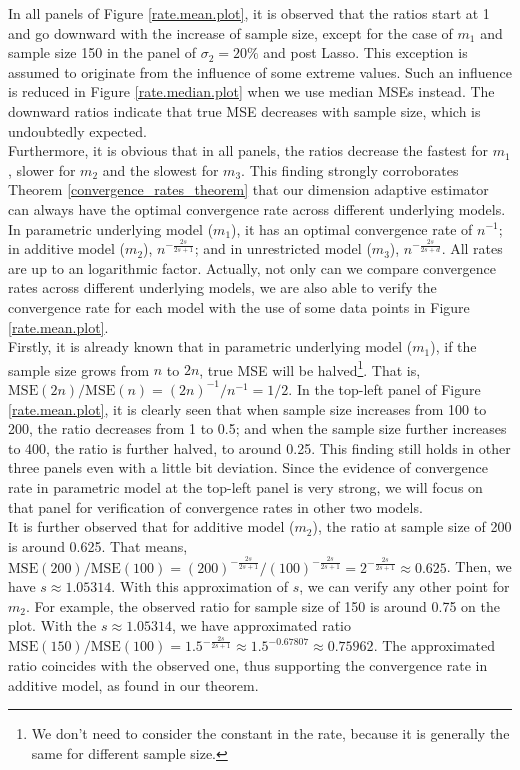 \documentclass[12pt, a4paper]{article}
\theoremstyle{MAstyle} \newtheorem{assumption}{Assumption}[section]
\theoremstyle{MAstyle} \newtheorem{definition}{Definition}[section]
\theoremstyle{MAstyle} \newtheorem{theorem}{Theorem}[section]
\theoremstyle{MAstyle} \newtheorem{corollary}{Corollary}[section]
\begin{document}
                In all panels of Figure \ref{rate.mean.plot}, it is observed that the ratios start at 1 and go downward with the increase of sample size, except for the case of $m_1$ and sample size 150 in the panel of $\sigma_2=20\%$ and post Lasso. This exception is assumed to originate from the influence of some extreme values. Such an influence is reduced in Figure \ref{rate.median.plot} when we use median MSEs instead. The downward ratios indicate that true MSE decreases with sample size, which is undoubtedly expected.\\

                Furthermore, it is obvious that in all panels, the ratios decrease the fastest for $m_1$, slower for $m_2$ and the slowest for $m_3$. This finding strongly corroborates Theorem \ref{convergence_rates_theorem} that our dimension adaptive estimator can always have the optimal convergence rate across different underlying models. In parametric underlying model ($m_1$), it has an optimal convergence rate of $n^{-1}$; in additive model ($m_2$), $n^{-\frac{2s}{2s+1}}$; and in unrestricted model ($m_3$), $n^{-\frac{2s}{2s+d}}$. All rates are up to an logarithmic factor. Actually, not only can we compare convergence rates across different underlying models, we are also able to verify the convergence rate for each model with the use of some data points in Figure \ref{rate.mean.plot}.\\

                Firstly, it is already known that in parametric underlying model ($m_1$), if the sample size grows from $n$ to $2n$, true MSE will be halved\footnote{We don't need to consider the constant in the rate, because it is generally the same for different sample size.}. That is, $\mathrm{MSE}(2n)/\mathrm{MSE}(n)=(2n)^{-1}/n^{-1}=1/2$. In the top-left panel of Figure \ref{rate.mean.plot}, it is clearly seen that when sample size increases from 100 to 200, the ratio decreases from 1 to 0.5; and when the sample size further increases to 400, the ratio is further halved, to around 0.25. This finding still holds in other three panels even with a little bit deviation. Since the evidence of convergence rate in parametric model at the top-left panel is very strong, we will focus on that panel for verification of convergence rates in other two models.\\

                It is further observed that for additive model ($m_2$), the ratio at sample size of 200 is around 0.625. That means, $\mathrm{MSE}(200)/\mathrm{MSE}(100)=(200)^{-\frac{2s}{2s+1}}/(100)^{-\frac{2s}{2s+1}}=2^{-\frac{2s}{2s+1}} \approx 0.625$. Then, we have $s \approx 1.05314$. With this approximation of $s$, we can verify any other point for $m_2$. For example, the observed ratio for sample size of 150 is around 0.75 on the plot. With the $s \approx 1.05314$, we have approximated ratio $\mathrm{MSE}(150)/\mathrm{MSE}(100)=1.5^{-\frac{2s}{2s+1}} \approx 1.5^{-0.67807} \approx 0.75962$. The approximated ratio coincides with the observed one, thus supporting the convergence rate in additive model, as found in our theorem.\\
\end{document}

